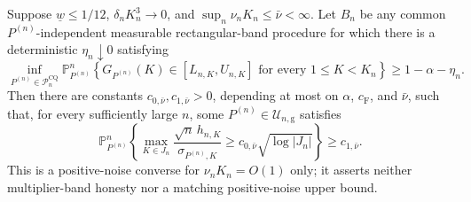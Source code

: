 Suppose \(\underline w\leq1/12\), \(\delta_nK_n^3\to0\), and \(\sup_n\nu_nK_n\leq\bar\nu<\infty\).  Let \(B_n\) be any common \(P^{(n)}\)-independent measurable rectangular-band procedure for which there is a deterministic \(\eta_n\downarrow0\) satisfying
\[
 \inf_{P^{(n)}\in\mathcal P_n^{\mathrm{CQ}}}
 \mathbb P_{P^{(n)}}^n\!\left\{
 G_{P^{(n)}}(K)\in[L_{n,K},U_{n,K}]
 \text{ for every }1\leq K<K_n\right\}
 \geq1-\alpha-\eta_n.
\]
Then there are constants \(c_{0,\bar\nu},c_{1,\bar\nu}>0\), depending at most on \(\alpha\), \(c_{\mathrm F}\), and \(\bar\nu\), such that, for every sufficiently large \(n\), some \(P^{(n)}\in\mathcal U_{n,\mathrm g}\) satisfies
\[
 \mathbb P_{P^{(n)}}^n\!\left\{
 \max_{K\in J_n}\frac{\sqrt n\,h_{n,K}}{\sigma_{P^{(n)},K}}
 \geq c_{0,\bar\nu}\sqrt{\log|J_n|}\right\}\geq c_{1,\bar\nu}.
\]
This is a positive-noise converse for \(\nu_nK_n=O(1)\) only; it asserts neither multiplier-band honesty nor a matching positive-noise upper bound.